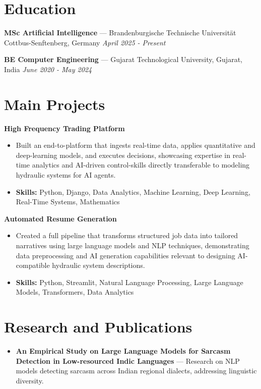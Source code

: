 \documentclass[a4paper,10pt]{article}
\begin{document}
\section*{Education}
\textbf{MSc Artificial Intelligence} — Brandenburgische Technische Universität Cottbus-Senftenberg, Germany \hfill \textit{April 2025 - Present}\par
\vspace{1.5pt}
\textbf{BE Computer Engineering} — Gujarat Technological University, Gujarat, India \hfill \textit{June 2020 - May 2024}\par

\section*{Main Projects}
\textbf{High Frequency Trading Platform}\par
\vspace{1pt}
\begin{itemize}
  \item Built an end-to-platform that ingests real-time data, applies quantitative and deep-learning models, and executes decisions, showcasing expertise in real-time analytics and AI-driven control-skills directly transferable to modeling hydraulic systems for AI agents.
  \item \textbf{Skills:} Python, Django, Data Analytics, Machine Learning, Deep Learning, Real-Time Systems, Mathematics
\end{itemize}
\vspace{3pt}
\textbf{Automated Resume Generation}\par
\vspace{1pt}
\begin{itemize}
  \item Created a full pipeline that transforms structured job data into tailored narratives using large language models and NLP techniques, demonstrating data preprocessing and AI generation capabilities relevant to designing AI-compatible hydraulic system descriptions.
  \item \textbf{Skills:} Python, Streamlit, Natural Language Processing, Large Language Models, Transformers, Data Analytics
\end{itemize}

\section*{Research and Publications}
\begin{itemize}
\item \textbf{An Empirical Study on Large Language Models for Sarcasm Detection in Low-resourced Indic Languages} — Research on NLP models detecting sarcasm across Indian regional dialects, addressing linguistic diversity.
\end{itemize}
\end{document}
